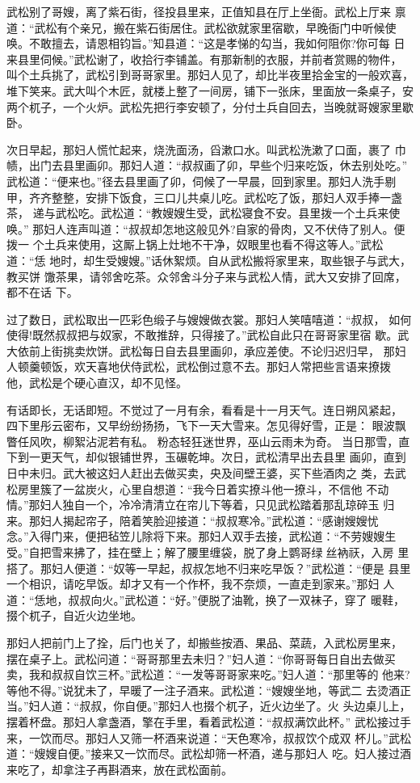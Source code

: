 武松别了哥嫂，离了紫石街，径投县里来，正值知县在厅上坐衙。武松上厅来
禀道：“武松有个亲兄，搬在紫石街居住。武松欲就家里宿歇，早晚衙门中听候使
唤。不敢擅去，请恩相钧旨。”知县道：“这是孝悌的勾当，我如何阻你?你可每
日来县里伺候。”武松谢了，收拾行李铺盖。有那新制的衣服，并前者赏赐的物件，
叫个土兵挑了，武松引到哥哥家里。那妇人见了，却比半夜里拾金宝的一般欢喜，
堆下笑来。武大叫个木匠，就楼上整了一间房，铺下一张床，里面放一条桌子，安
两个杌子，一个火炉。武松先把行李安顿了，分付土兵自回去，当晚就哥嫂家里歇
卧。

次日早起，那妇人慌忙起来，烧洗面汤，舀漱口水。叫武松洗漱了口面，裹了
巾帻，出门去县里画卯。那妇人道：“叔叔画了卯，早些个归来吃饭，休去别处吃。”
武松道：“便来也。”径去县里画了卯，伺候了一早晨，回到家里。那妇人洗手剔
甲，齐齐整整，安排下饭食，三口儿共桌儿吃。武松吃了饭，那妇人双手捧一盏茶，
递与武松吃。武松道：“教嫂嫂生受，武松寝食不安。县里拨一个土兵来使唤。”
那妇人连声叫道：“叔叔却怎地这般见外?自家的骨肉，又不伏侍了别人。便拨一
个土兵来使用，这厮上锅上灶地不干净，奴眼里也看不得这等人。”武松道：“恁
地时，却生受嫂嫂。”话休絮烦。自从武松搬将家里来，取些银子与武大，教买饼
馓茶果，请邻舍吃茶。众邻舍斗分子来与武松人情，武大又安排了回席，都不在话
下。

过了数日，武松取出一匹彩色缎子与嫂嫂做衣裳。那妇人笑嘻嘻道：“叔叔，
如何使得!既然叔叔把与奴家，不敢推辞，只得接了。”武松自此只在哥哥家里宿
歇。武大依前上街挑卖炊饼。武松每日自去县里画卯，承应差使。不论归迟归早，
那妇人顿羹顿饭，欢天喜地伏侍武松，武松倒过意不去。那妇人常把些言语来撩拨
他，武松是个硬心直汉，却不见怪。

有话即长，无话即短。不觉过了一月有余，看看是十一月天气。连日朔风紧起，
四下里彤云密布，又早纷纷扬扬，飞下一天大雪来。怎见得好雪，正是：
眼波飘瞥任风吹，柳絮沾泥若有私。
粉态轻狂迷世界，巫山云雨未为奇。
当日那雪，直下到一更天气，却似银铺世界，玉碾乾坤。次日，武松清早出去县里
画卯，直到日中未归。武大被这妇人赶出去做买卖，央及间壁王婆，买下些酒肉之
类，去武松房里簇了一盆炭火，心里自想道：“我今日着实撩斗他一撩斗，不信他
不动情。”那妇人独自一个，冷冷清清立在帘儿下等着，只见武松踏着那乱琼碎玉
归来。那妇人揭起帘子，陪着笑脸迎接道：“叔叔寒冷。”武松道：“感谢嫂嫂忧
念。”入得门来，便把毡笠儿除将下来。那妇人双手去接，武松道：“不劳嫂嫂生
受。”自把雪来拂了，挂在壁上；解了腰里缠袋，脱了身上鹦哥绿丝衲祆，入房
里搭了。那妇人便道：“奴等一早起，叔叔怎地不归来吃早饭？”武松道：“便是
县里一个相识，请吃早饭。却才又有一个作杯，我不奈烦，一直走到家来。”那妇
人道：“恁地，叔叔向火。”武松道：“好。”便脱了油靴，换了一双袜子，穿了
暖鞋，掇个杌子，自近火边坐地。

那妇人把前门上了拴，后门也关了，却搬些按酒、果品、菜蔬，入武松房里来，
摆在桌子上。武松问道：“哥哥那里去未归？”妇人道：“你哥哥每日自出去做买
卖，我和叔叔自饮三杯。”武松道：“一发等哥哥家来吃。”妇人道：“那里等的
他来?等他不得。”说犹未了，早暖了一注子酒来。武松道：“嫂嫂坐地，等武二
去烫酒正当。”妇人道：“叔叔，你自便。”那妇人也掇个杌子，近火边坐了。火
头边桌儿上，摆着杯盘。那妇人拿盏酒，擎在手里，看着武松道：“叔叔满饮此杯。”
武松接过手来，一饮而尽。那妇人又筛一杯酒来说道：“天色寒冷，叔叔饮个成双
杯儿。”武松道：“嫂嫂自便。”接来又一饮而尽。武松却筛一杯酒，递与那妇人
吃。妇人接过酒来吃了，却拿注子再斟酒来，放在武松面前。

